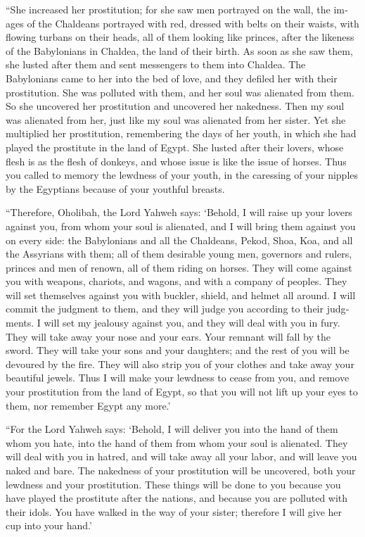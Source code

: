 \begin{paracol}{2}
\begin{otherlanguage}{english}
 ``She increased her prostitution; for she saw men
portrayed on the wall, the images of the Chaldeans portrayed with red,
 dressed with belts on their waists, with flowing turbans
on their heads, all of them looking like princes, after the likeness of
the Babylonians in Chaldea, the land of their birth.  As
soon as she saw them, she lusted after them and sent messengers to them
into Chaldea.  The Babylonians came to her into the bed
of love, and they defiled her with their prostitution. She was polluted
with them, and her soul was alienated from them.  So she
uncovered her prostitution and uncovered her nakedness. Then my soul was
alienated from her, just like my soul was alienated from her sister.
 Yet she multiplied her prostitution, remembering the
days of her youth, in which she had played the prostitute in the land of
Egypt.  She lusted after their lovers, whose flesh is as
the flesh of donkeys, and whose issue is like the issue of horses.
 Thus you called to memory the lewdness of your youth, in
the caressing of your nipples by the Egyptians because of your youthful
breasts.

 ``Therefore, Oholibah, the Lord Yahweh says: `Behold, I
will raise up your lovers against you, from whom your soul is alienated,
and I will bring them against you on every side:  the
Babylonians and all the Chaldeans, Pekod, Shoa, Koa, and all the
Assyrians with them; all of them desirable young men, governors and
rulers, princes and men of renown, all of them riding on horses.
 They will come against you with weapons, chariots, and
wagons, and with a company of peoples. They will set themselves against
you with buckler, shield, and helmet all around. I will commit the
judgment to them, and they will judge you according to their judgments.
 I will set my jealousy against you, and they will deal
with you in fury. They will take away your nose and your ears. Your
remnant will fall by the sword. They will take your sons and your
daughters; and the rest of you will be devoured by the fire.
 They will also strip you of your clothes and take away
your beautiful jewels.  Thus I will make your lewdness to
cease from you, and remove your prostitution from the land of Egypt, so
that you will not lift up your eyes to them, nor remember Egypt any
more.'

 ``For the Lord Yahweh says: `Behold, I will deliver you
into the hand of them whom you hate, into the hand of them from whom
your soul is alienated.  They will deal with you in
hatred, and will take away all your labor, and will leave you naked and
bare. The nakedness of your prostitution will be uncovered, both your
lewdness and your prostitution.  These things will be
done to you because you have played the prostitute after the nations,
and because you are polluted with their idols.  You have
walked in the way of your sister; therefore I will give her cup into
your hand.'


\end{otherlanguage}
\end{paracol}
